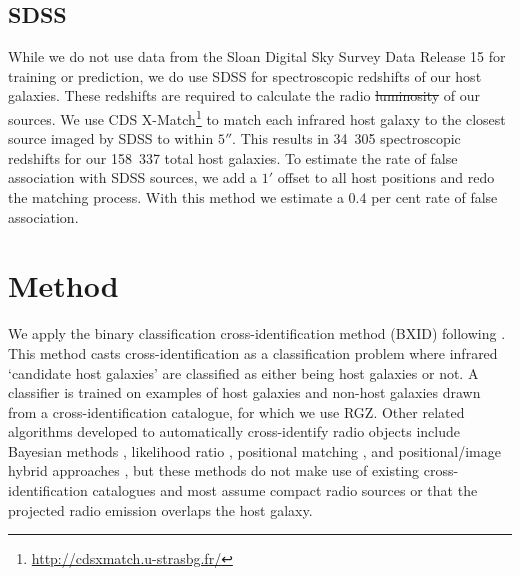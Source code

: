 \documentclass[11pt, a4paper]{book}
\newcommand{\nsources}{158~337}
\newcommand{\nsourceszsp}{34~305}
\providecommand{\DIFaddtex}[1]{{\protect\color{blue}\uwave{#1}}} %
\providecommand{\DIFdeltex}[1]{{\protect\color{red}\sout{#1}}}                      %
\providecommand{\DIFaddbegin}{} %
\providecommand{\DIFaddend}{} %
\providecommand{\DIFdelbegin}{} %
\providecommand{\DIFdelend}{} %
\providecommand{\DIFadd}[1]{\texorpdfstring{\DIFaddtex{#1}}{#1}} %
\providecommand{\DIFdel}[1]{\texorpdfstring{\DIFdeltex{#1}}{}} %
\newcommand{\DIFscaledelfig}{0.5}
\newlength{\DIFdelgraphicswidth} %
\newlength{\DIFdelgraphicsheight} %
\newcommand{\DIFaddincludegraphics}[2][]{{\color{blue}\fbox{\DIFOincludegraphics[#1]{#2}}}} %
\newcommand{\DIFdelincludegraphics}[2][]{%
\sbox{\DIFdelgraphicsbox}{\DIFOincludegraphics[#1]{#2}}%
\settoboxwidth{\DIFdelgraphicswidth}{\DIFdelgraphicsbox} %
\settoboxtotalheight{\DIFdelgraphicsheight}{\DIFdelgraphicsbox} %
\scalebox{\DIFscaledelfig}{%
\parbox[b]{\DIFdelgraphicswidth}{\usebox{\DIFdelgraphicsbox}\\[-\baselineskip] \rule{\DIFdelgraphicswidth}{0em}}\llap{\resizebox{\DIFdelgraphicswidth}{\DIFdelgraphicsheight}{%
\setlength{\unitlength}{\DIFdelgraphicswidth}%
\begin{picture}(1,1)%
\thicklines\linethickness{2pt} %
{\color[rgb]{1,0,0}\put(0,0){\framebox(1,1){}}}%
{\color[rgb]{1,0,0}\put(0,0){\line( 1,1){1}}}%
{\color[rgb]{1,0,0}\put(0,1){\line(1,-1){1}}}%
\end{picture}%
}\hspace*{3pt}}} %
} %
\DeclareRobustCommand{\DIFaddbegin}{\DIFOaddbegin \let\includegraphics\DIFaddincludegraphics} %
\DeclareRobustCommand{\DIFaddend}{\DIFOaddend \let\includegraphics\DIFOincludegraphics} %
\DeclareRobustCommand{\DIFdelbegin}{\DIFOdelbegin \let\includegraphics\DIFdelincludegraphics} %
\DeclareRobustCommand{\DIFdelend}{\DIFOaddend \let\includegraphics\DIFOincludegraphics} %
\begin{document}
    \subsection{SDSS} \label{sec:rlfs-sdss-data}

    While we do not use data from the Sloan Digital Sky Survey Data Release 15 \citep[SDSS;][]{sdss} for training or prediction, we do use SDSS for spectroscopic redshifts of our host galaxies. These redshifts are required to calculate the radio \DIFdelbegin \DIFdel{luminosity }\DIFdelend \DIFaddbegin \DIFadd{luminosities }\DIFaddend of our sources. We use CDS X-Match\footnote{\url{http://cdsxmatch.u-strasbg.fr/}} to match each infrared host galaxy to the closest source imaged by SDSS to within $5''$. This results in \nsourceszsp{} spectroscopic redshifts for our \nsources{} total host galaxies. To estimate the rate of false association with SDSS sources, we add a $1'$ offset to all host positions and redo the matching process. With this method we estimate a $0.4$ per cent rate of false association.

\section{Method}\label{sec:rlfs-method}

We apply the binary classification cross-identification method (BXID) following \citet{alger18radio}. This method casts cross-identification
as a classification problem where infrared `candidate host galaxies' are
classified as either being host galaxies or not. A classifier is trained
on examples of host galaxies and non-host galaxies drawn from a
cross-identification catalogue, for which we use RGZ. Other related
algorithms developed to automatically cross-identify radio objects
include Bayesian methods \citep{fan15}, likelihood ratio \citep{weston18lrpy},
 positional matching \citep[e.g.][]{kimball08, norris06, middelberg08}, and positional/image hybrid approaches \citep{van_velzen_radio_2012}, but these methods do not make use of existing
cross-identification catalogues and most assume compact radio sources or that the projected radio emission overlaps the host galaxy.
\end{document}

